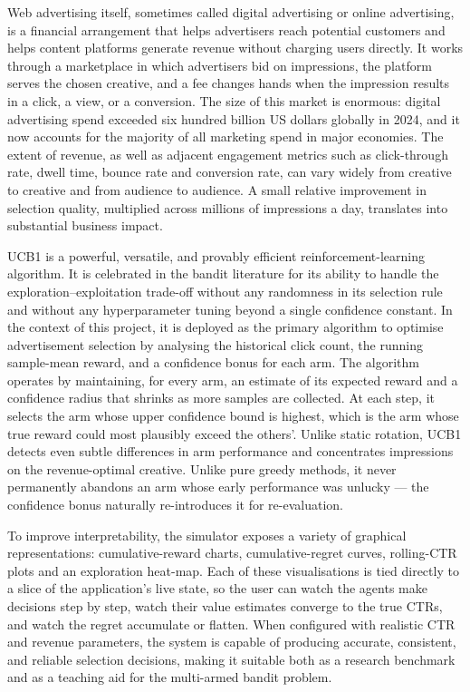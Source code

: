 Web advertising itself, sometimes called digital advertising or online advertising, is a financial arrangement that helps advertisers reach potential customers and helps content platforms generate revenue without charging users directly. It works through a marketplace in which advertisers bid on impressions, the platform serves the chosen creative, and a fee changes hands when the impression results in a click, a view, or a conversion. The size of this market is enormous: digital advertising spend exceeded six hundred billion US dollars globally in 2024, and it now accounts for the majority of all marketing spend in major economies. The extent of revenue, as well as adjacent engagement metrics such as click-through rate, dwell time, bounce rate and conversion rate, can vary widely from creative to creative and from audience to audience. A small relative improvement in selection quality, multiplied across millions of impressions a day, translates into substantial business impact.

UCB1 is a powerful, versatile, and provably efficient reinforcement-learning algorithm. It is celebrated in the bandit literature for its ability to handle the exploration--exploitation trade-off without any randomness in its selection rule and without any hyperparameter tuning beyond a single confidence constant. In the context of this project, it is deployed as the primary algorithm to optimise advertisement selection by analysing the historical click count, the running sample-mean reward, and a confidence bonus for each arm. The algorithm operates by maintaining, for every arm, an estimate of its expected reward and a confidence radius that shrinks as more samples are collected. At each step, it selects the arm whose upper confidence bound is highest, which is the arm whose true reward could most plausibly exceed the others'. Unlike static rotation, UCB1 detects even subtle differences in arm performance and concentrates impressions on the revenue-optimal creative. Unlike pure greedy methods, it never permanently abandons an arm whose early performance was unlucky --- the confidence bonus naturally re-introduces it for re-evaluation.

To improve interpretability, the simulator exposes a variety of graphical representations: cumulative-reward charts, cumulative-regret curves, rolling-CTR plots and an exploration heat-map. Each of these visualisations is tied directly to a slice of the application's live state, so the user can watch the agents make decisions step by step, watch their value estimates converge to the true CTRs, and watch the regret accumulate or flatten. When configured with realistic CTR and revenue parameters, the system is capable of producing accurate, consistent, and reliable selection decisions, making it suitable both as a research benchmark and as a teaching aid for the multi-armed bandit problem.

